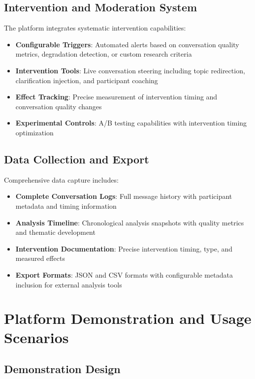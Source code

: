\documentclass[11pt,letterpaper]{article}
\begin{document}
\subsection{Intervention and Moderation System}

The platform integrates systematic intervention capabilities:

\begin{itemize}
    \item \textbf{Configurable Triggers}: Automated alerts based on conversation quality metrics, degradation detection, or custom research criteria
    \item \textbf{Intervention Tools}: Live conversation steering including topic redirection, clarification injection, and participant coaching
    \item \textbf{Effect Tracking}: Precise measurement of intervention timing and conversation quality changes
    \item \textbf{Experimental Controls}: A/B testing capabilities with intervention timing optimization
\end{itemize}

\subsection{Data Collection and Export}

Comprehensive data capture includes:

\begin{itemize}
    \item \textbf{Complete Conversation Logs}: Full message history with participant metadata and timing information
    \item \textbf{Analysis Timeline}: Chronological analysis snapshots with quality metrics and thematic development
    \item \textbf{Intervention Documentation}: Precise intervention timing, type, and measured effects
    \item \textbf{Export Formats}: JSON and CSV formats with configurable metadata inclusion for external analysis tools
\end{itemize}

\section{Platform Demonstration and Usage Scenarios}

\subsection{Demonstration Design}
\end{document}
